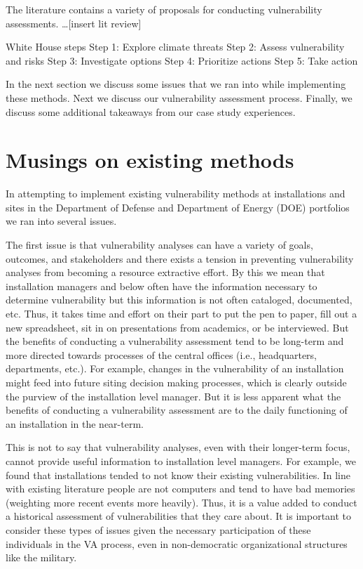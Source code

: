 \documentclass[10pt]{amsart}
\begin{document}
The literature contains a variety of proposals for conducting vulnerability assessments. 
\ldots [insert lit review]

White House steps
Step 1: Explore climate threats
Step 2: Assess vulnerability and risks
Step 3: Investigate options
Step 4: Prioritize actions
Step 5: Take action


In the next section we discuss some issues that we ran into while implementing these methods.
Next we discuss our vulnerability assessment process.
Finally, we discuss some additional takeaways from our case study experiences.

\section{Musings on existing methods}
In attempting to implement existing vulnerability methods at installations and sites in the Department of Defense and Department of Energy (DOE) portfolios we ran into several issues.

The first issue is that vulnerability analyses can have a variety of goals, outcomes, and stakeholders and there exists a tension in preventing vulnerability analyses from becoming a resource extractive effort.
By this we mean that installation managers and below often have the information necessary to determine vulnerability but this information is not often cataloged, documented, etc.
Thus, it takes time and effort on their part to put the pen to paper, fill out a new spreadsheet, sit in on presentations from academics, or be interviewed.
But the benefits of conducting a vulnerability assessment tend to be long-term and more directed towards processes of the central offices (i.e., headquarters, departments, etc.).
For example, changes in the vulnerability of an installation might feed into future siting decision making processes, which is clearly outside the purview of the installation level manager.
But it is less apparent what the benefits of conducting a vulnerability assessment are to the daily functioning of an installation in the near-term.

This is not to say that vulnerability analyses, even with their longer-term focus, cannot provide useful information to installation level managers.
For example, we found that installations tended to not know their existing vulnerabilities.
In line with existing literature people are not computers and tend to have bad memories (weighting more recent events more heavily).
Thus, it is a value added to conduct a historical assessment of vulnerabilities that they care about.
It is important to consider these types of issues given the necessary participation of these individuals in the VA process, even in non-democratic organizational structures like the military. 
\end{document}
